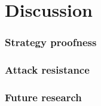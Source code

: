 \chapter{Discussion}

\subsection{Strategy proofness}
\subsection{Attack resistance}
\subsection{Future research}
